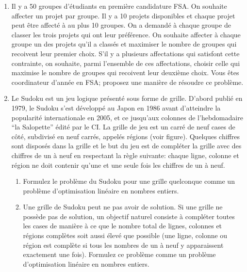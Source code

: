 \begin{enumerate}
  \item  Il y a 50 groupes d'étudiants en première candidature FSA. On souhaite affecter un projet par groupe. Il y a 10
    projets disponibles et chaque projet peut être affecté à au plus 10 groupes. On a demandé à chaque groupe de classer les trois projets qui ont leur
    préférence. On souhaite affecter à chaque groupe un des projets qu'il a classés et maximiser le nombre de groupes qui recoivent leur premier choix.
    S'il y a plusieurs affectations qui satisfont cette contrainte, on souhaite, parmi l'ensemble de ces affectations, choisir celle qui maximise le nombre de groupes
    qui recoivent leur deuxième choix. Vous êtes coordinateur d'année en FSA; proposez une manière de résoudre ce problème.


    \begin{solution}
      \nosolution
    \end{solution}

  \item Le Sudoku est un jeu logique présenté sous forme de grille.
    D'abord publié en 1979, le Sudoku s'est développé au Japon en 1986 avant d'atteindre la popularité internationale en 2005, et ce jusqu'aux colonnes de l'hebdomadaire ``la Salopette'' édité par le CI.
    La grille de jeu est un carré de neuf cases de côté, subdivisé en neuf carrés, appelés régions (voir figure).
    Quelques chiffres sont disposés dans la grille et le but du jeu est de compléter la grille avec des chiffres  de un à neuf en respectant la règle suivante: chaque ligne, colonne et région ne doit contenir qu'une et une seule fois  les chiffres de un à neuf.

    \begin{enumerate}

      \item Formulez le problème du Sudoku pour une grille quelconque comme
        un problème  d'optimisation linéaire en nombres entiers.

      \item Une grille de Sudoku peut ne pas avoir de solution.
        Si une grille ne possède pas de solution,
        un objectif naturel consiste
        à compléter  toutes les cases de manière à ce que
        le nombre total de lignes,
        colonnes et régions complètes soit aussi élevé que possible
        (une ligne, colonne ou région est complète si tous les nombres de
        un à neuf y apparaissent exactement une fois).
        Formulez ce problème comme un problème d'optimisation linéaire
  en nombres entiers.


\end{enumerate}
\end{enumerate}
